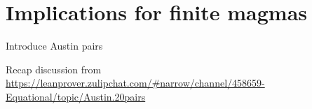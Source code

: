 \section{Implications for finite magmas}


Introduce Austin pairs

Recap discussion from \url{https://leanprover.zulipchat.com/#narrow/channel/458659-Equational/topic/Austin.20pairs}
